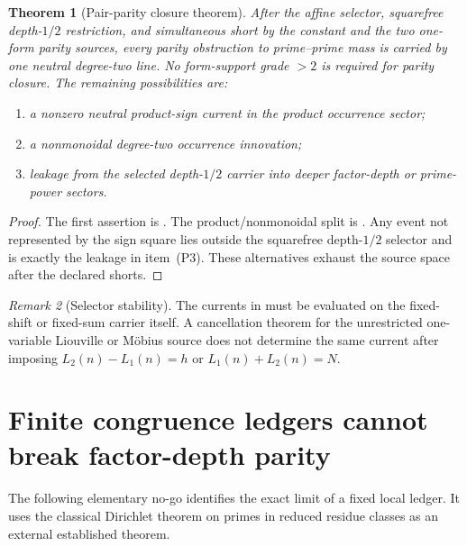 \documentclass[11pt]{article}
\newtheorem{theorem}{Theorem}[section]
\theoremstyle{definition}
\theoremstyle{remark}
\newtheorem{remark}[theorem]{Remark}
\begin{document}
\begin{theorem}[Pair-parity closure theorem]
\label{thm:pair-parity-closure}
After the affine selector, squarefree depth-$1/2$ restriction, and simultaneous
short by the constant and the two one-form parity sources, every parity
obstruction to prime--prime mass is carried by one neutral degree-two line.
No form-support grade $>2$ is required for parity closure.  The remaining
possibilities are:
\begin{enumerate}[label=\textup{(P\arabic*)},leftmargin=3em]
\item a nonzero neutral product-sign current in the product occurrence sector;
\item a nonmonoidal degree-two occurrence innovation;
\item leakage from the selected depth-$1/2$ carrier into deeper factor-depth or
      prime-power sectors.
\end{enumerate}
\end{theorem}

\begin{proof}
The first assertion is .  The product/nonmonoidal
split is .  Any event not represented by
the sign square lies outside the squarefree depth-$1/2$ selector and is exactly
the leakage in item~\textup{(P3)}.  These alternatives exhaust the source
space after the declared shorts.
\end{proof}

\begin{remark}[Selector stability]
The currents in  must be evaluated on the fixed-shift or
fixed-sum carrier itself.  A cancellation theorem for the unrestricted
one-variable Liouville or M\"obius source does not determine the same current
after imposing $L_2(n)-L_1(n)=h$ or $L_1(n)+L_2(n)=N$.
\end{remark}

\section{Finite congruence ledgers cannot break factor-depth parity}
\label{sec:parity-no-go}

The following elementary no-go identifies the exact limit of a fixed local
ledger.  It uses the classical Dirichlet theorem on primes in reduced residue
classes as an external established theorem.
\end{document}
